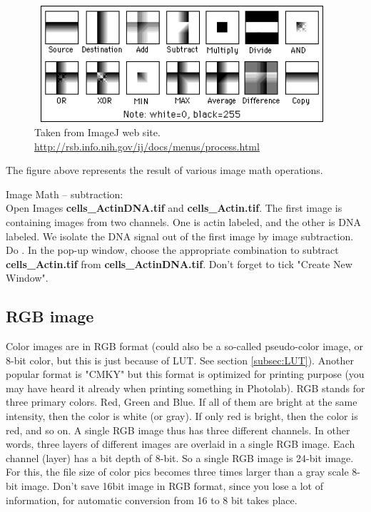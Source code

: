 \begin{figure}[h!]
\begin{center}
\includegraphics[width=10.945cm,height=4.323cm]{fig/CMCIBasicCourse201102-img13.png}
\caption{Taken from ImageJ web site. \url{http://rsb.info.nih.gov/ij/docs/menus/process.html}}
\label{fig:img13}
\end{center}
\end{figure}

The figure above represents the result of various image math operations. 

\begin{indentexercise}{1}
Image Math -- subtraction:\\
Open Images \textbf{cells\_ActinDNA.tif} and \textbf{cells\_Actin.tif}.
The first image is containing images from two channels. One is actin
labeled, and the other is DNA labeled. We isolate the DNA signal out of
the first image by image subtraction. Do . In the pop-up window, choose the appropriate combination to subtract \textbf{cells\_Actin.tif} from \textbf{cells\_ActinDNA.tif}. Don't forget to tick "Create New Window". 
\end{indentexercise}


\subsection{RGB image}
\label{subsec:rgb}

Color images are in RGB format (could also be a so-called pseudo-color image, or
8-bit color, but this is just because of LUT. See section \ref{subsec:LUT}).
Another popular format is "CMKY" but this
format is optimized for printing purpose (you may have heard it already
when printing something in Photolab). RGB stands for three
primary colors. Red, Green and Blue. If all of them are bright at the
same intensity, then the color is white (or gray). If only red is
bright, then the color is red, and so on. A single RGB image thus has
three different channels. In other words, three layers of different
images are overlaid in a single RGB image. Each channel (layer) has a
bit depth of 8-bit. So a single RGB image is 24-bit image. For this,
the file size of color pics becomes three times larger than a gray scale
8-bit image. Don't save 16bit image in RGB format,
since you lose a lot of information, for automatic conversion from 16
to 8 bit takes place. 


